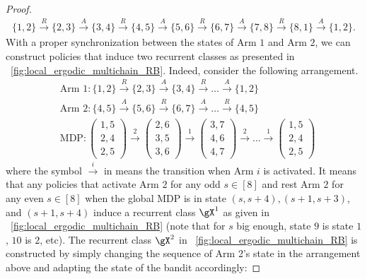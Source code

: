 \begin{proof}
    \begin{align*}
        \{1,2\} \overset{R}{\to} \{2,3\} \overset{A}{\to} \{3,4\} \overset{R}{\to} \{4,5\} \overset{A}{\to} \{5,6\} \overset{R}{\to} \{6,7\} \overset{A}{\to} \{7,8\} \overset{R}{\to} \{8,1\} \overset{A}{\to} \{1,2\}.
    \end{align*}
    With a proper synchronization between the states of Arm $1$ and Arm $2$, we can construct policies that induce two recurrent classes as presented in \figurename~\ref{fig:local_ergodic_multichain_RB}.
    Indeed, consider the following arrangement.
    \begin{align}
        &\text{Arm 1} : \{1,2\} \overset{R}{\to} \{2,3\} \overset{A}{\to} \{3,4\} \overset{R}{\to} \dots \overset{A}{\to} \{1,2\} \nonumber \\
        &\text{Arm 2} : \{4,5\} \overset{A}{\to} \{5,6\} \overset{R}{\to} \{6,7\} \overset{A}{\to} \dots \overset{R}{\to} \{4,5\} \nonumber \\
        &\text{MDP} : \begin{pmatrix}1,5\\2,4\\2,5\end{pmatrix} \overset{2}{\to} \begin{pmatrix}2,6\\3,5\\3,6\end{pmatrix} \overset{1}{\to} \begin{pmatrix}3,7\\4,6\\4,7\end{pmatrix} \overset{2}{\to} \dots \overset{1}{\to} \begin{pmatrix}1,5\\2,4\\2,5\end{pmatrix} \label{eq:mdp_transition}
    \end{align}
    where the symbol $\overset{i}{\to}$ in  means the transition when Arm $i$ is activated.
    It means that any policies that activate Arm $2$ for any odd $s\in[8]$ and rest Arm $2$ for any even $s\in[8]$ when the global MDP is in state $(s,s+4), (s+1,s+3)$, and $(s+1,s+4)$ induce a recurrent class $\gX^1$ as given in \figurename~\ref{fig:local_ergodic_multichain_RB} (note that for $s$ big enough, state $9$ is state $1$, $10$ is $2$, etc).
    The recurrent class $\gX^2$ in \figurename~\ref{fig:local_ergodic_multichain_RB} is constructed by simply changing the sequence of Arm 2's state in the arrangement above and adapting the state of the bandit accordingly:

\end{proof}
